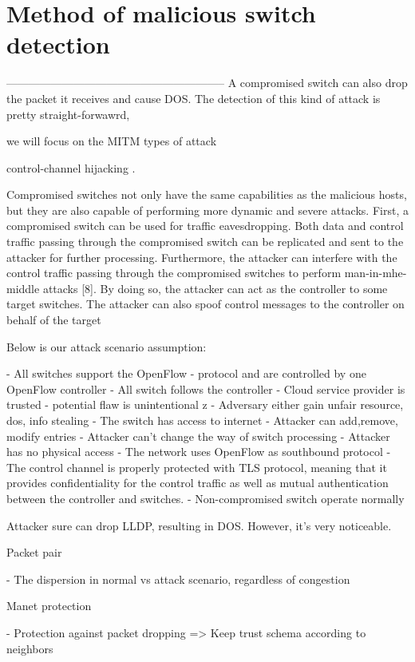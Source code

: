 \chapter{Method of malicious switch detection}

-----------------------------------------------------------
A compromised switch can also drop the packet it receives and cause DOS. The detection of this kind of attack is pretty straight-forwawrd, 

we will focus on the MITM types of attack


control-channel hijacking \cite{SIYN}. 


Compromised switches not only have the same capabilities as the malicious hosts, but they are also capable of performing more dynamic and severe attacks.
First, a compromised switch can be used for traffic eavesdropping. Both data and control traffic passing through the compromised switch can be replicated and sent to the attacker for further processing. Furthermore, the
attacker can interfere with the control traffic passing through the compromised
switches to perform man-in-mhe-middle attacks [8]. By doing so, the
attacker can act as the controller to some target switches. The attacker can
also spoof control messages to the controller on behalf of the target

Below is our attack scenario assumption: 

- All switches support the OpenFlow
- protocol and are controlled by one OpenFlow controller
- All switch follows the controller
- Cloud service provider is trusted
- potential flaw is unintentional z
- Adversary either gain unfair resource, dos, info stealing
- The switch has access to internet
- Attacker can add,remove, modify entries
- Attacker can’t change the way of switch processing
- Attacker has no physical access
- The network uses OpenFlow as southbound protocol
- The control channel is properly protected with TLS protocol, meaning
that it provides confidentiality for the control traffic as well as mutual
authentication between the controller and switches.
- Non-compromised switch operate normally

Attacker sure can drop LLDP, resulting in DOS. However, it’s very noticeable.

Packet pair

- The dispersion in normal vs attack scenario, regardless of congestion


Manet protection

- Protection against packet dropping => Keep trust schema according to neighbors

